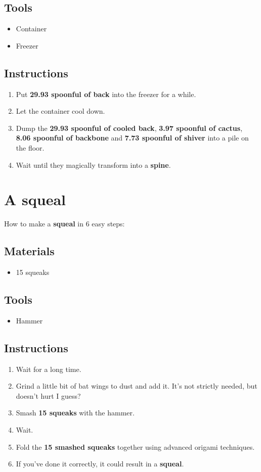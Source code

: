 \documentclass{article}
\begin{document}
\subsection{Tools}\begin{itemize}
\item 
Container
\item 
Freezer
\end{itemize}
\subsection{Instructions}\begin{enumerate}
\item 
Put \textbf{29.93 spoonful of back} into the freezer for a while.
\item 
Let the container cool down.
\item 
Dump the \textbf{29.93 spoonful of cooled back}, \textbf{3.97 spoonful of cactus}, \textbf{8.06 spoonful of backbone} and \textbf{7.73 spoonful of shiver} into a pile on the floor.
\item 
Wait until they magically transform into a \textbf{spine}.
\end{enumerate}
\newpage
\section{A squeal}How to make a \textbf{squeal} in 6 easy steps:

\subsection{Materials}\begin{itemize}
\item 
15 squeaks
\end{itemize}
\subsection{Tools}\begin{itemize}
\item 
Hammer
\end{itemize}
\subsection{Instructions}\begin{enumerate}
\item 
Wait for a long time.
\item 
Grind a little bit of bat wings to dust and add it. It's not strictly needed, but doesn't hurt I guess?
\item 
Smash \textbf{15 squeaks} with the hammer.
\item 
Wait.
\item 
Fold the \textbf{15 smashed squeaks} together using advanced origami techniques.
\item 
If you've done it correctly, it could result in a \textbf{squeal}.
\end{enumerate}
\newpage
\end{document}
